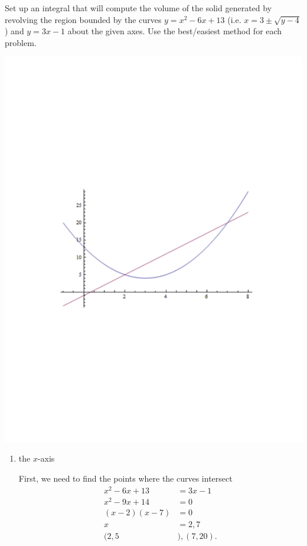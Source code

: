 \documentclass[noinstructornotes]{ximera}
\begin{document}
\begin{problem}
Set up an integral that will compute the volume of the solid generated by revolving the region bounded by the curves $y=x^2-6x+13$ (i.e. $x = 3 \pm \sqrt{y-4}$) and $y=3x-1$ about the given axes.  Use the best/easiest method for each problem.

\begin{image}
\includegraphics[trim= 170 270 150 280, scale=0.8]{Figure6-4-1.pdf}
\end{image}

	\begin{enumerate}
		\item  the $x$-axis
		\begin{freeResponse}
		First, we need to find the points where the curves intersect
			\begin{align*}
			x^2 - 6x + 13 &= 3x - 1  \\
			x^2 - 9x + 14 &= 0  \\
			(x-2)(x-7) &= 0  \\
			x &= 2, 7  \\
			(2,5&), (7,20).
			\end{align*}
		

\end{freeResponse}
\end{enumerate}
\end{problem}
\end{document}
